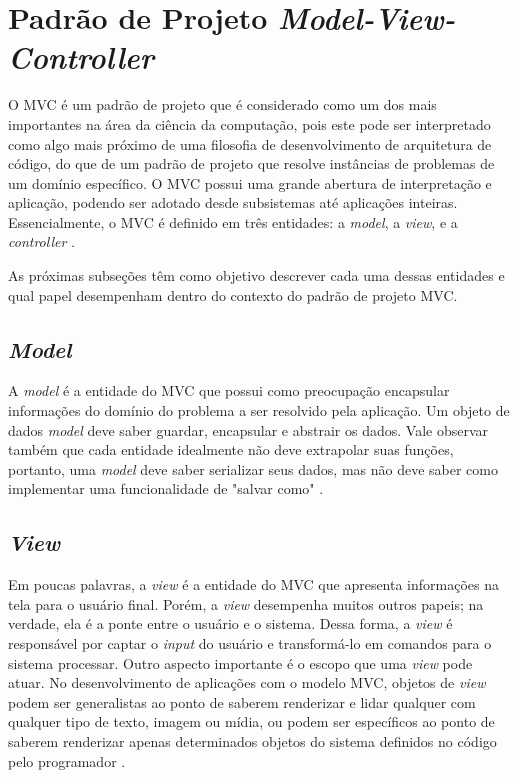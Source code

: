 \section{Padrão de Projeto \textit{Model-View-Controller}}

O MVC é um padrão de projeto que é considerado como um dos mais importantes na área da ciência da computação, pois este pode ser interpretado como algo mais próximo de uma filosofia de desenvolvimento de arquitetura de código, do que de um padrão de projeto que resolve instâncias de problemas de um domínio específico. O MVC possui uma grande abertura de interpretação e aplicação, podendo ser adotado desde subsistemas até aplicações inteiras. Essencialmente, o MVC é definido em três entidades: a \textit{model}, a \textit{view}, e a \textit{controller} \cite{Bucanek2009}.

As próximas subseções têm como objetivo descrever cada uma dessas entidades e qual papel desempenham dentro do contexto do padrão de projeto MVC.

\subsection{\textit{Model}}

A \textit{model} é a entidade do MVC que possui como preocupação encapsular informações do domínio do problema a ser resolvido pela aplicação. Um objeto de dados \textit{model} deve saber guardar, encapsular e abstrair os dados. Vale observar também que cada entidade idealmente não deve extrapolar suas funções, portanto, uma \textit{model} deve saber serializar seus dados, mas não deve saber como implementar uma funcionalidade de "salvar como" \cite{Bucanek2009}.

\subsection{\textit{View}}

Em poucas palavras, a \textit{view} é a entidade do MVC que apresenta informações na tela para o usuário final. Porém, a \textit{view} desempenha muitos outros papeis; na verdade, ela é a ponte entre o usuário e o sistema. Dessa forma, a \textit{view} é responsável por captar o \textit{input} do usuário e transformá-lo em comandos para o sistema processar. Outro aspecto importante é o escopo que uma \textit{view} pode atuar. No desenvolvimento de aplicações com o modelo MVC, objetos de \textit{view} podem ser generalistas ao ponto de saberem renderizar e lidar qualquer com qualquer tipo de texto, imagem ou mídia, ou podem ser específicos ao ponto de saberem renderizar apenas determinados objetos do sistema definidos no código pelo programador \cite{Bucanek2009}.

